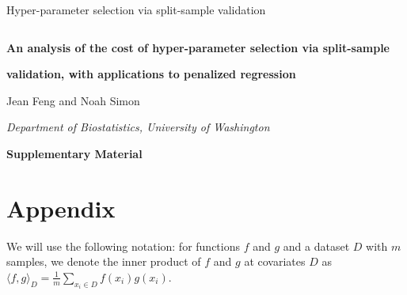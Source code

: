 \documentclass[10pt]{book}
\theoremstyle{definition}
\begin{document}

\renewcommand{\baselinestretch}{2}


{\hfill {\footnotesize\rm Hyper-parameter selection via split-sample validation} \hfill}

\renewcommand{\thefootnote}{}
$\ $\par \fontsize{12}{14pt plus.8pt minus .6pt}\selectfont


\centerline{\large\bf An analysis of the cost of hyper-parameter selection via split-sample}
\vspace{2pt}
\centerline{\large\bf validation, with applications to penalized regression}
\vspace{.25cm}
\centerline{Jean Feng and Noah Simon}
\vspace{.4cm}
\centerline{\it Department of Biostatistics, University of Washington}
\vspace{.55cm}
\centerline{\bf Supplementary Material}
\fontsize{9}{11.5pt plus.8pt minus .6pt}\selectfont
\noindent
\par

\setcounter{section}{0}
\setcounter{equation}{0}
\def\theequation{S\arabic{section}.\arabic{equation}}
\def\thesection{S\arabic{section}}

\fontsize{12}{14pt plus.8pt minus .6pt}\selectfont

\section{Appendix}\label{sec:proofs}

We will use the following notation: for functions $f$ and $g$ and a dataset $D$ with $m$ samples, we denote the inner product of $f$ and $g$ at covariates $D$ as $\langle f,g \rangle_{D} = \frac{1}{m} \sum_{x_i \in D} f(x_i) g(x_i) $.
\end{document}
